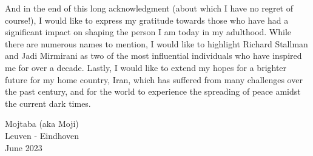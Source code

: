 And in the end of this long acknowledgment (about which I have no regret of course!), I would like to express my gratitude towards those who have had a significant impact on shaping the person I am today in my adulthood. While there are numerous names to mention, I would like to highlight Richard Stallman and Jadi Mirmirani as two of the most influential individuals who have inspired me for over a decade. Lastly, I would like to extend my hopes for a brighter future for my home country, Iran, which has suffered from many challenges over the past century, and for the world to experience the spreading of peace amidst the current dark times.

Mojtaba (aka Moji)\\
Leuven - Eindhoven\\
June 2023




\cleardoublepage

